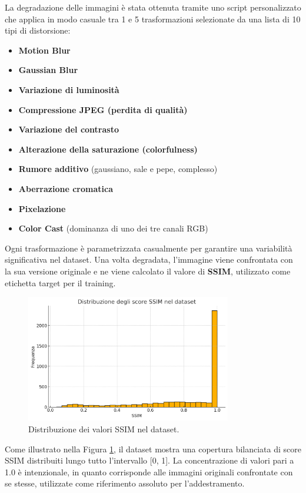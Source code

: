 La degradazione delle immagini è stata ottenuta tramite uno script personalizzato che applica in modo casuale tra 1 e 5 trasformazioni selezionate da una lista di 10 tipi di distorsione:
\begin{itemize}
    \item \textbf{Motion Blur}
    \item \textbf{Gaussian Blur}
    \item \textbf{Variazione di luminosità}
    \item \textbf{Compressione JPEG (perdita di qualità)}
    \item \textbf{Variazione del contrasto}
    \item \textbf{Alterazione della saturazione (colorfulness)}
    \item \textbf{Rumore additivo} (gaussiano, sale e pepe, complesso)
    \item \textbf{Aberrazione cromatica}
    \item \textbf{Pixelazione}
    \item \textbf{Color Cast} (dominanza di uno dei tre canali RGB)
\end{itemize}

Ogni trasformazione è parametrizzata casualmente per garantire una variabilità significativa nel dataset. Una volta degradata, l'immagine viene confrontata con la sua versione originale e ne viene calcolato il valore di \textbf{SSIM}, utilizzato come etichetta target per il training.

\begin{figure}[H]
    \centering
    \includegraphics[width=0.8\textwidth]{imgs/ssim_distribution.png}
    \caption{Distribuzione dei valori SSIM nel dataset.}
    \label{fig:ssim_dist}
\end{figure}

Come illustrato nella Figura \ref{fig:ssim_dist}, il dataset mostra una copertura bilanciata di score SSIM distribuiti lungo tutto l’intervallo [0, 1]. La concentrazione di valori pari a 1.0 è intenzionale, in quanto corrisponde alle immagini originali confrontate con se stesse, utilizzate come riferimento assoluto per l’addestramento.
